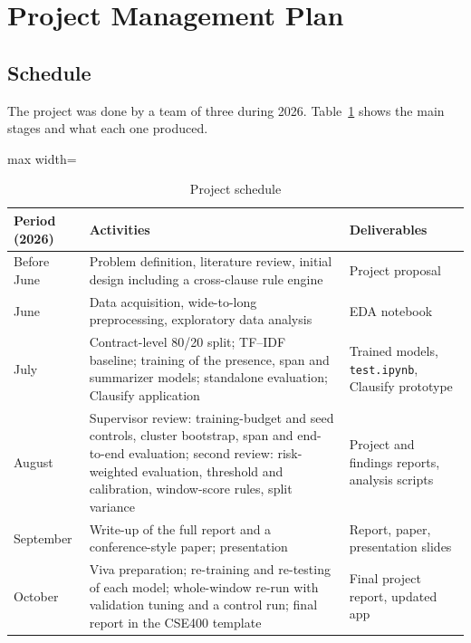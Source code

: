 \section{Project Management Plan}
\label{sec:pm}
\subsection{Schedule}
The project was done by a team of three during 2026. Table~\ref{tab:schedule} shows the main stages and what each one produced.

\begin{table}[!ht]
\centering
\caption{Project schedule}
\label{tab:schedule}
\small
\begin{adjustbox}{max width=\textwidth}
\begin{tabular}{>{\raggedright\arraybackslash}p{2.6cm} >{\raggedright\arraybackslash}p{6.0cm} >{\raggedright\arraybackslash}p{4.8cm}}
\toprule
\textbf{Period (2026)} & \textbf{Activities} & \textbf{Deliverables}\\
\midrule
Before June & Problem definition, literature review, initial design including a cross-clause rule engine & Project proposal\\
\addlinespace
June & Data acquisition, wide-to-long preprocessing, exploratory data analysis & EDA notebook\\
\addlinespace
July & Contract-level 80/20 split; TF--IDF baseline; training of the presence, span and summarizer models; standalone evaluation; Clausify application & Trained models, \texttt{test.ipynb}, Clausify prototype\\
\addlinespace
August & Supervisor review: training-budget and seed controls, cluster bootstrap, span and end-to-end evaluation; second review: risk-weighted evaluation, threshold and calibration, window-score rules, split variance & Project and findings reports, analysis scripts\\
\addlinespace
September & Write-up of the full report and a conference-style paper; presentation & Report, paper, presentation slides\\
\addlinespace
October & Viva preparation; re-training and re-testing of each model; whole-window re-run with validation tuning and a control run; final report in the CSE400 template & Final project report, updated app\\
\bottomrule
\end{tabular}
\end{adjustbox}
\end{table}

